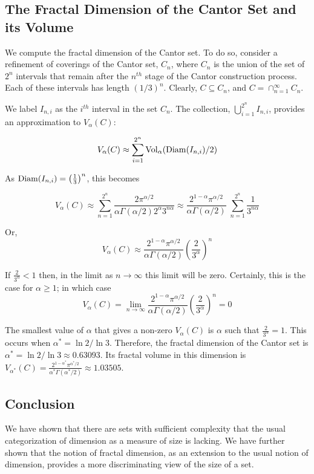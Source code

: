 \subsection{The Fractal Dimension of the Cantor Set and its Volume}
We compute the fractal dimension of the Cantor set. To do so, 
consider a refinement of coverings of the Cantor set, $C_n$, where
$C_n$ is the union of the set of $2^n$ intervals that remain after 
the $n^{th}$ stage of the Cantor construction process. Each of these 
intervals has length $(1/3)^n$. 
Clearly, $C \subseteq C_n$, and $C = \cap_{n=1}^\infty C_n$. 

We label $I_{n,i}$ as the $i^{th}$ interval in the set
$C_n$. The collection, $\bigcup_{i=1}^{2^n} I_{n,i}$, provides an
approximation to $V_\alpha(C)$:


$$
V_\alpha(C) \approx \sum_{i=1}^{2^n} {\rm Vol}_\alpha({\rm
  Diam}(I_{n,i}) / 2)
$$

As ${\rm Diam}(I_{n,i}) = \left(\frac{1}{3}\right)^n$, this becomes


$$
V_\alpha(C) \approx \sum_{n=1}^{2^n} \frac{2
  \pi^{\alpha/2}}{ \alpha \Gamma(\alpha/2) 2^\alpha 3^{n\alpha}} 
  \approx  \frac{
  2^{1 - \alpha} \pi^{\alpha/2}}{\alpha \Gamma(\alpha/2)} \;
  \sum_{n=1}^{2^n}  
\frac{1}{3^{n\alpha}}
$$

Or, 
$$
V_\alpha(C) \approx \frac{ 2^{1-\alpha} \pi^{\alpha/2}}{\alpha
  \Gamma(\alpha/2)} (\frac{2}{3^\alpha})^n
$$


If $\frac{2}{3^\alpha} < 1$ then, in the limit as 
$n \rightarrow \infty$ 
this limit will be zero. Certainly,
this is the case for $\alpha \ge 1$; in which case 
$$
V_\alpha(C) =  \lim_{n \rightarrow \infty}  \frac{ 2^{1-\alpha} 
\pi^{\alpha/2}}{\alpha
  \Gamma(\alpha/2)} (\frac{2}{3^\alpha})^n = 0 
$$

The smallest value of $\alpha$ that gives a non-zero $V_\alpha(C)$ 
is $\alpha$ such that $\frac{2}{3^\alpha} = 1$. 
This occurs when
$\alpha^* = \ln 2 / \ln 3$. Therefore, the fractal dimension of the
Cantor set is $\alpha^* = \ln 2 / \ln 3 \approx 0.63093$. 
Its fractal volume in this
dimension is $V_{\alpha^*}(C) =  \frac{2^{1-\alpha^*} 
\pi^{\alpha^*/2}}{\alpha^*
\Gamma(\alpha^* / 2)} \approx 1.03505 $.

\subsection{Conclusion}
We have shown that there are sets with sufficient complexity that the
usual categorization of dimension as a measure of size is lacking. 
We have further shown
that the notion of fractal dimension, as an extension to the usual
notion of dimension, provides a more discriminating view of the size
of a set.

